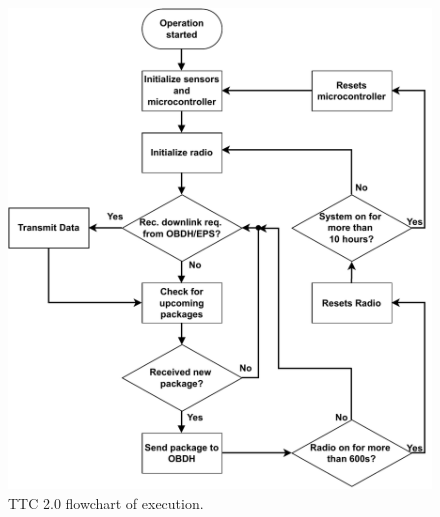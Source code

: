 \begin{figure}[!ht]
    \begin{center}
        \includegraphics[width=\textwidth]{figures/ttc2-flowchart.pdf}
        \caption{TTC 2.0 flowchart of execution.}
        \label{fig:ttc_flowchart}
    \end{center}
\end{figure}
